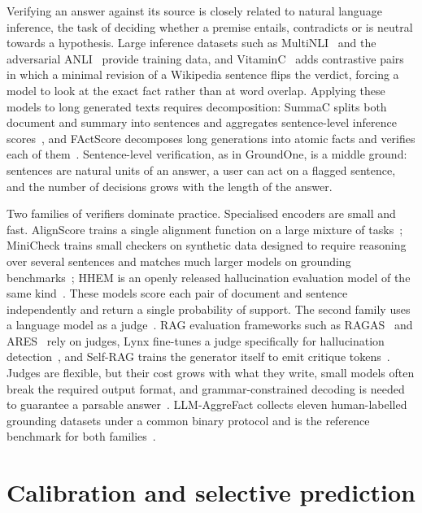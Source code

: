 Verifying an answer against its source is closely related to natural language inference, the task of deciding whether a
premise entails, contradicts or is neutral towards a hypothesis. Large inference datasets such as
MultiNLI~\cite{williams2018mnli} and the adversarial ANLI~\cite{nie2020anli} provide training data, and
VitaminC~\cite{schuster2021vitaminc} adds contrastive pairs in which a minimal revision of a Wikipedia sentence flips the
verdict, forcing a model to look at the exact fact rather than at word overlap. Applying these models to long generated
texts requires decomposition: SummaC splits both document and summary into sentences and aggregates sentence-level
inference scores~\cite{laban2022summac}, and FActScore decomposes long generations into atomic facts and verifies each of
them~\cite{min2023factscore}. Sentence-level verification, as in GroundOne, is a middle ground: sentences are natural
units of an answer, a user can act on a flagged sentence, and the number of decisions grows with the length of the
answer.

Two families of verifiers dominate practice. Specialised encoders are small and fast. AlignScore trains a single
alignment function on a large mixture of tasks~\cite{zha2023alignscore}; MiniCheck trains small checkers on synthetic data
designed to require reasoning over several sentences and matches much larger models on grounding
benchmarks~\cite{tang2024minicheck}; HHEM is an openly released hallucination evaluation model of the same
kind~\cite{vectara2024hhem}. These models score each pair of document and sentence independently and return a single
probability of support. The second family uses a language model as a judge~\cite{zheng2023judging}. RAG evaluation
frameworks such as RAGAS~\cite{es2024ragas} and ARES~\cite{saadfalcon2024ares} rely on judges, Lynx fine-tunes a judge
specifically for hallucination detection~\cite{ravi2024lynx}, and Self-RAG trains the generator itself to emit critique
tokens~\cite{asai2024selfrag}. Judges are flexible, but their cost grows with what they write, small models often break
the required output format, and grammar-constrained decoding is needed to guarantee a parsable
answer~\cite{willard2023outlines}. LLM-AggreFact collects eleven human-labelled grounding datasets under a common binary
protocol and is the reference benchmark for both families~\cite{tang2024minicheck,llmaggrefact}.

\section{Calibration and selective prediction}
\label{sec:bg-calibration}

